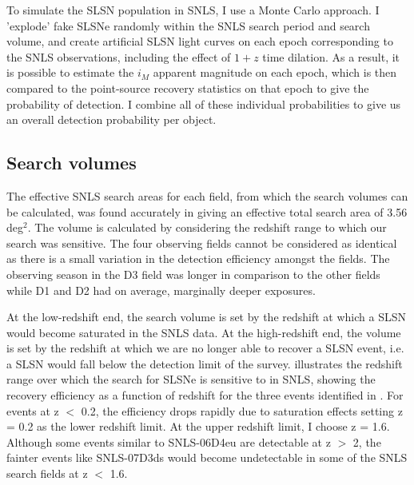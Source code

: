 To simulate the SLSN population in SNLS, I use a Monte Carlo approach. I 'explode' fake SLSNe randomly within the SNLS search period and search volume, and create artificial SLSN light curves on each epoch corresponding to the SNLS observations, including the effect of $1+z$ time dilation. As a result, it is possible to estimate the $i_M$ apparent magnitude on each epoch, which is then compared to the point-source recovery statistics on that epoch to give the probability of detection. I combine all of these individual probabilities to give us an overall detection probability per object.

\subsection{Search volumes}
\label{sec:search-volumes}
The effective SNLS search areas for each field, from which the search volumes can be calculated, was found accurately in \citet{Perrett2012} giving an effective total search area of 3.56\,deg$^2$. The volume is calculated by considering the redshift range to which our search was sensitive. The four observing fields cannot be considered as identical as there is a small variation in the detection efficiency amongst the fields. The observing season in the D3 field was longer in comparison to the other fields while D1 and D2 had on average, marginally deeper exposures.

At the low-redshift end, the search volume is set by the redshift at which a SLSN would become saturated in the SNLS data. At the high-redshift end, the volume is set by the redshift at which we are no longer able to recover a SLSN event, i.e. a SLSN would fall below the detection limit of the survey.  illustrates the redshift range over which the search for SLSNe is sensitive to in SNLS, showing the recovery efficiency as a function of redshift for the three events identified in . For events at z $<$ 0.2, the efficiency drops rapidly due to saturation effects setting z = 0.2 as the lower redshift limit. At the upper redshift limit, I choose z = 1.6. Although some events similar to SNLS-06D4eu are detectable at z $>$ 2, the fainter events like SNLS-07D3ds would become undetectable in some of the SNLS search fields at z $<$ 1.6.

